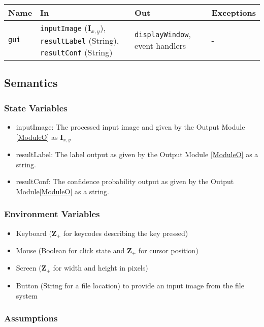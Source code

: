 \documentclass[12pt, titlepage]{article}
\def\code#1{\texttt{#1}}
\begin{document}
\begin{center}
\begin{tabular}{p{2cm} p{4cm} p{4cm} p{2cm}}
\hline
\textbf{Name} & \textbf{In} & \textbf{Out} & \textbf{Exceptions} \\
\hline
\code{gui} & \code{inputImage} ($\mathbf{I}_{x,y}$), \code{resultLabel} (String), \code{resultConf} (String) & \code{displayWindow}, event handlers & - \\
\hline
\end{tabular}
\end{center}

\subsection{Semantics}

\subsubsection{State Variables}

\begin{itemize}
  \item inputImage: The processed input image and given by the Output Module \ref{ModuleO} as $\mathbf{I}_{x,y}$
  \item resultLabel: The label output as given by the Output Module \ref{ModuleO} as a string.
  \item resultConf: The confidence probability output as given by the Output Module\ref{ModuleO} as a string.
\end{itemize}

\subsubsection{Environment Variables}

\begin{itemize}
  \item Keyboard ($\mathbf{Z}_{+}$ for keycodes describing the key pressed)
  \item Mouse (Boolean for click state and  $\mathbf{Z}_{+}$ for cursor position)
  \item Screen ($\mathbf{Z}_{+}$ for width and height in pixels)
  \item Button (String for a file location) to provide an input image from the file system
\end{itemize}

\subsubsection{Assumptions}
\end{document}

